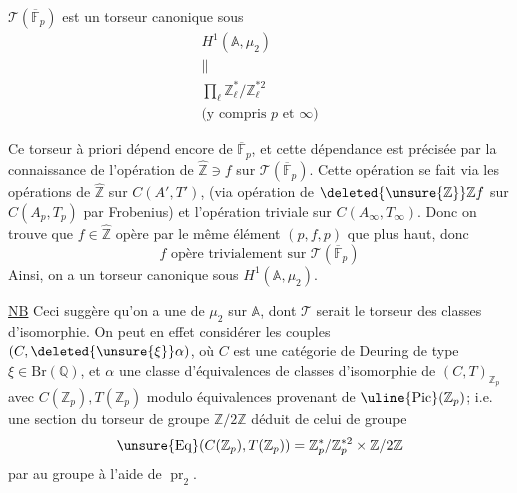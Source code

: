 
$\mathcal T(\overline{\mathbb F}_p)$ est un torseur canonique sous
\[
\begin{gathered}
H^1(\mathbb A,\mu_2)\\
\parallel\\
\prod_{\ell}\mathbb Z_\ell^*/\mathbb Z_\ell^{*2}\\
\text{(y compris $p$ et $\infty$)}
\end{gathered}
\]

Ce torseur à priori dépend encore de $\overline{\mathbb F}_p$,  et cette dépendance est précisée par la connaissance de l'opération de $\widehat{\mathbb Z}\ni f$ sur $\mathcal T(\overline{\mathbb F}_p)$.
Cette opération se fait via les opérations de $\widehat{\mathbb Z}$ sur $C(A',T')$,
(via opération de $\deleted{\unsure{\mathbb Z}}\mathbb Zf$ sur $C(A_p,T_p)$ par Frobenius) et l'opération triviale sur $C(A_\infty,T_\infty)$.
Donc on trouve que $f\in\widehat{\mathbb Z}$ opère par le même élément $(p,f,p)$ que plus haut, donc
\[
f\text{ opère trivialement sur }\mathcal T(\overline{\mathbb F}_p)
\]
Ainsi, on a un torseur canonique  sous $H^1(\mathbb A,\mu_2)$.

\uline{NB} Ceci suggère qu'on a une    de  $\mu_2$ sur $\mathbb A$, dont $\mathcal T$ serait le torseur des classes d'isomorphie.
On peut en effet considérer les couples $(C,\deleted{\unsure{\xi}}\alpha)$, où $C$ est une catégorie de Deuring de type $\xi\in\mathrm{Br}(\mathbb Q)$,  et $\alpha$ une  classe d'équivalences de classes d'isomorphie  de $(C,T)_{\mathbb Z_p}$ avec $C(\mathbb Z_p),T(\mathbb Z_p)$ modulo équivalences provenant de $\uline{\operatorname{Pic}}(\mathbb Z_p)$; i.e. une section du torseur de groupe $\mathbb Z/2\mathbb Z$ déduit de celui de groupe
\[
\unsure{\mathrm{Eq}}(C(\mathbb Z_p),T(\mathbb Z_p))
=\mathbb Z_p^*/\mathbb Z_p^{*2}\times\mathbb Z/2\mathbb Z
\]
 par  au groupe  à l'aide de $\operatorname{pr}_2$.


